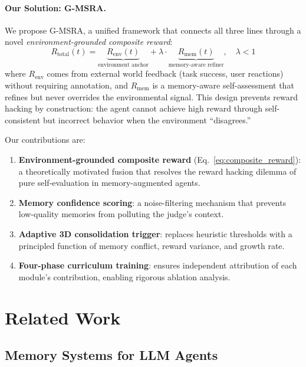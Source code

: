 \documentclass{article}
\newcommand{\gmsra}{\textsc{G-MSRA}}
\newcommand{\renv}{R_{\mathrm{env}}}
\newcommand{\rmem}{R_{\mathrm{mem}}}
\newcommand{\rtotal}{R_{\mathrm{total}}}
\begin{document}
\paragraph{Our Solution: \gmsra{}.}
We propose \gmsra{}, a unified framework that connects all three lines through a novel \emph{environment-grounded composite reward}:
\begin{equation}
\rtotal(t) = \underbrace{\renv(t)}_{\text{environment anchor}} + \lambda \cdot \underbrace{\rmem(t)}_{\text{memory-aware refiner}}, \quad \lambda < 1
\label{eq:composite_reward}
\end{equation}
where $\renv$ comes from external world feedback (task success, user reactions) without requiring annotation, and $\rmem$ is a memory-aware self-assessment that refines but never overrides the environmental signal. This design prevents reward hacking by construction: the agent cannot achieve high reward through self-consistent but incorrect behavior when the environment ``disagrees.''

Our contributions are:
\begin{enumerate}[leftmargin=*, nosep]
    \item \textbf{Environment-grounded composite reward} (Eq.~\ref{eq:composite_reward}): a theoretically motivated fusion that resolves the reward hacking dilemma of pure self-evaluation in memory-augmented agents.
    \item \textbf{Memory confidence scoring}: a noise-filtering mechanism that prevents low-quality memories from polluting the judge's context.
    \item \textbf{Adaptive 3D consolidation trigger}: replaces heuristic thresholds with a principled function of memory conflict, reward variance, and growth rate.
    \item \textbf{Four-phase curriculum training}: ensures independent attribution of each module's contribution, enabling rigorous ablation analysis.
\end{enumerate}

\section{Related Work}
\label{sec:related}

\subsection{Memory Systems for LLM Agents}
\end{document}
